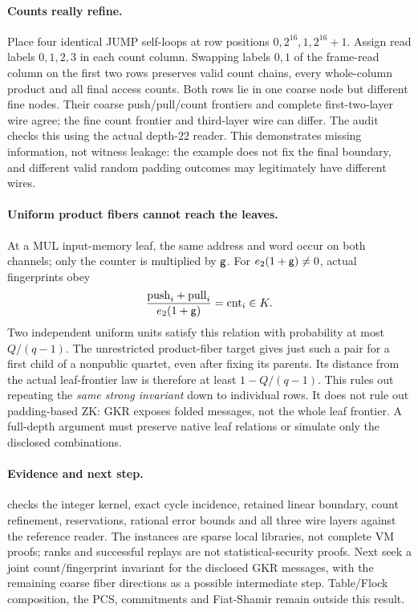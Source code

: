\documentclass[11pt]{article}
\begin{document}
\paragraph{Counts really refine.} Place four identical JUMP self-loops at row positions $0,2^{16},1,2^{16}+1$. Assign read labels $0,1,2,3$ in each count column. Swapping labels $0,1$ of the frame-read column on the first two rows preserves valid count chains, every whole-column product and all final access counts. Both rows lie in one coarse node but different fine nodes. Their coarse push/pull/count frontiers and complete first-two-layer wire agree; the fine count frontier and third-layer wire can differ. The audit checks this using the actual depth-$22$ reader. This demonstrates missing information, not witness leakage: the example does not fix the final boundary, and different valid random padding outcomes may legitimately have different wires.

\paragraph{Uniform product fibers cannot reach the leaves.} At a MUL input-memory leaf, the same address and word occur on both channels; only the counter is multiplied by $\mathsf{g}$. For $e_2(1+\mathsf{g})\ne0$, actual fingerprints obey
\[
 \frac{\mathrm{push}_i+\mathrm{pull}_i}{e_2(1+\mathsf{g})}=\mathrm{cnt}_i\in K.
\]
Two independent uniform units satisfy this relation with probability at most $Q/(q-1)$. The unrestricted product-fiber target gives just such a pair for a first child of a nonpublic quartet, even after fixing its parents. Its distance from the actual leaf-frontier law is therefore at least $1-Q/(q-1)$. This rules out repeating the \emph{same strong invariant} down to individual rows. It does not rule out padding-based ZK: GKR exposes folded messages, not the whole leaf frontier. A full-depth argument must preserve native leaf relations or simulate only the disclosed combinations.

\paragraph{Evidence and next step.}  checks the integer kernel, exact cycle incidence, retained linear boundary, count refinement, reservations, rational error bounds and all three wire layers against the reference reader. The instances are sparse local libraries, not complete VM proofs; ranks and successful replays are not statistical-security proofs. Next seek a joint count/fingerprint invariant for the disclosed GKR messages, with the remaining coarse fiber directions as a possible intermediate step. Table/Flock composition, the PCS, commitments and Fiat-Shamir remain outside this result.
\end{document}
